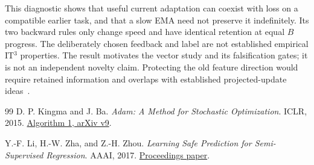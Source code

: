 \documentclass[11pt,a4paper]{article}
\begin{document}
This diagnostic shows that useful current adaptation can coexist with loss
on a compatible earlier task, and that a slow EMA need not preserve it
indefinitely. Its two backward rules only change speed and have identical
retention at equal $B$ progress. The deliberately chosen feedback and label
are not established empirical IT$^3$ properties. The result motivates the
vector study and its falsification gates; it is not an independent novelty
claim. Protecting the old feature direction would require retained
information and overlaps with established projected-update ideas~\cite{ogd}.

\begin{thebibliography}{99}\small
{} D. P. Kingma and J. Ba. \emph{Adam: A Method for Stochastic Optimization}.
ICLR, 2015. \href{https://arxiv.org/pdf/1412.6980v9}{Algorithm 1, arXiv v9}.

 Y.-F. Li, H.-W. Zha, and Z.-H. Zhou.
\emph{Learning Safe Prediction for Semi-Supervised Regression}. AAAI, 2017.
\href{https://ojs.aaai.org/index.php/AAAI/article/download/10856/10715}{Proceedings paper}.


\end{thebibliography}
\end{document}
